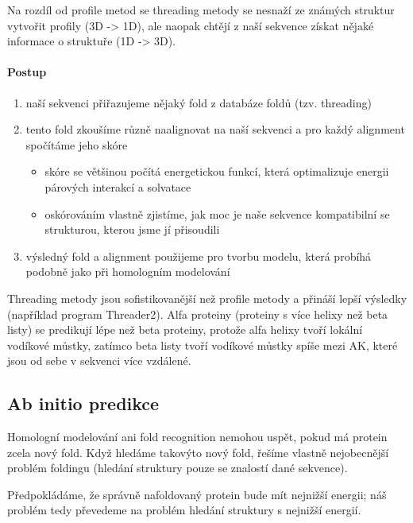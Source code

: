 \documentclass[DIV=8]{scrreprt}
\begin{document}
Na rozdíl od profile metod se threading metody se nesnaží ze známých struktur vytvořit profily (3D -> 1D), ale naopak chtějí z naší sekvence získat nějaké informace o struktuře (1D -> 3D).

\paragraph{Postup}
\begin{enumerate}[nosep]
    \item naší sekvenci přiřazujeme nějaký fold z databáze foldů (tzv. threading)
    \item tento fold zkoušíme různě naalignovat na naší sekvenci a pro každý alignment spočítáme jeho skóre
\begin{itemize}[nosep]
    \item skóre se většinou počítá energetickou funkcí, která optimalizuje energii párových interakcí a solvatace
    \item oskórováním vlastně zjistíme, jak moc je naše sekvence kompatibilní se strukturou, kterou jsme jí přisoudili
\end{itemize}

    \item výsledný fold a alignment použijeme pro tvorbu modelu, která probíhá podobně jako při homologním modelování
\end{enumerate}



Threading metody jsou sofistikovanější než profile metody a přináší lepší výsledky (například program Threader2). Alfa proteiny (proteiny s více helixy než beta listy) se predikují lépe než beta proteiny, protože alfa helixy tvoří lokální vodíkové můstky, zatímco beta listy tvoří vodíkové můstky spíše mezi AK, které jsou od sebe v sekvenci více vzdálené.

\subsection{Ab initio predikce} \label{Ab initio predikce}


Homologní modelování ani fold recognition nemohou uspět, pokud má protein zcela nový fold. Když hledáme takovýto nový fold, řešíme vlastně nejobecnější problém foldingu (hledání struktury pouze se znalostí dané sekvence).

Předpokládáme, že správně nafoldovaný protein bude mít nejnižší energii; náš problém tedy převedeme na problém hledání struktury s nejnižší energií.
\end{document}
